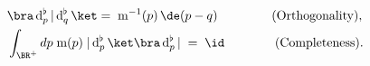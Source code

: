 \begin{equation} \label{orthcomp2} \begin{aligned}
{} & \bra\,{\rm d}_p^\flat\,|\,{\rm d}_q^\flat\,\ket = \;{\rm m}^{-1}(p)\,\de(p-q)
\qquad\qquad\;\text{\rm (Orthogonality)}, \\
{}& 
\int_{\BR^+}dp \;{\rm m}(p) \;|\,{\rm d}_p^\flat\,\ket \bra\,{\rm d}_p^\flat\,|
\;= \;\id \qquad \qquad\text{\rm (Completeness)}.
\end{aligned}\end{equation} 
